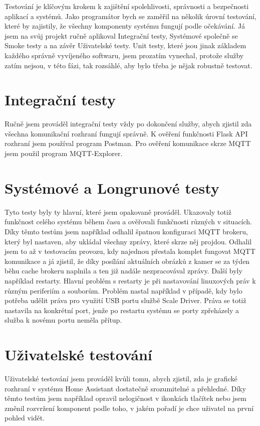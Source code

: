 Testování je klíčovým krokem k zajištění spolehlivosti, správnosti a bezpečnosti aplikací a systémů.
Jako programátor bych se zaměřil na několik úrovní testování, které by zajistily, že všechny komponenty systému fungují podle očekávání.
Já jsem na svůj projekt ručně aplikoval Integrační testy, Systémové společně se Smoke testy a na závěr Uživatelské testy.
Unit testy, které jsou jinak základem každého správně vyvíjeného softwaru, jsem prozatím vynechal, protože služby zatím nejsou, v této fázi, tak rozsáhlé, aby bylo třeba je nějak robustně testovat.

\section{Integrační testy}\label{sec:integracni-testy}
Ručně jsem prováděl integrační testy vždy po dokončení služby, abych zjistil zda všechna komunikační rozhraní fungují správně.
K ověření funkčnosti Flask API rozhraní jsem používal program Postman.
Pro ověření komunikace skrze MQTT jsem použil program MQTT-Explorer.

\section{Systémové a Longrunové testy}\label{sec:systemove-a-smoke-testy}
Tyto testy byly ty hlavní, které jsem opakovaně prováděl.
Ukazovaly totiž funkčnost celého systému během času a ověřovali funkčnosti různých v situacích.
Díky těmto testům jsem například odhalil špatnou konfiguraci MQTT brokeru, který byl nastaven, aby ukládal všechny zprávy, které skrze něj projdou.
Odhalil jsem to až v testovacím provozu, kdy najednou přestala komplet fungovat MQTT komunikace a já zjistil, že díky posílání aktuálních obrázků z kamer se za týden běhu cache brokeru naplnila a ten již nadále nezpracovával zprávy.\newline
Další byly například restarty.
Hlavní problém s restarty je při nastavování linuxových práv k různým periferiím a souborům.
Problém nastal například v případě, kdy bylo potřeba udělit práva pro využití USB portu službě Scale Driver.
Práva se totiž nastavila na konkrétní port, jenže po restartu systému se porty zpřeházely a služba k novému portu neměla přítup.

\section{Uživatelské testování}\label{sec:uzivatelske-testovani}
Uživatelské testování jsem prováděl kvůli tomu, abych zjistil, zda je grafické rozhraní v systému Home Assistant dostatečně srozumitelné a přehledné.
Díky těmto testům jsem například opravil nelogičnost v ikonkách tlačítek nebo jsem změnil rozvržení komponent podle toho, v jakém pořadí je chce uživatel na první pohled vidět.








